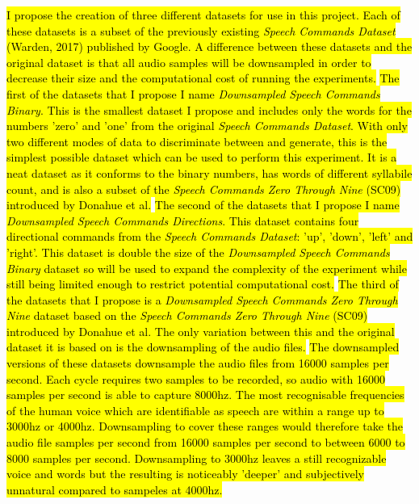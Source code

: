 \documentclass[titlepage]{article}
\begin{document}
\hl{
  I propose the creation of three different datasets for use in this project.
  Each of these datasets is a subset of the previously existing \textit{Speech Commands Dataset} (Warden, 2017) published by Google.
  A difference between these datasets and the original dataset is that all audio samples will be downsampled in order to decrease their size and the computational cost of running the experiments.
}
\newline
\newline
\hl{
  The first of the datasets that I propose I name \textit{Downsampled Speech Commands Binary}.
  This is the smallest dataset I propose and includes only the words for the numbers 'zero' and 'one' from the original \textit{Speech Commands Dataset}.
  With only two different modes of data to discriminate between and generate, this is the simplest possible dataset which can be used to perform this experiment.
  It is a neat dataset as it conforms to the binary numbers, has words of different syllabile count, and is also a subset of the \textit{Speech Commands Zero Through Nine} (SC09) introduced by Donahue et al.
}
\newline
\newline
\hl{
  The second of the datasets that I propose I name \textit{Downsampled Speech Commands Directions}.
  This dataset contains four directional commands from the \textit{Speech Commands Dataset}: 'up', 'down', 'left' and 'right'.
  This dataset is double the size of the \textit{Downsampled Speech Commands Binary} dataset so will be used to expand the complexity of the experiment while still being limited enough to restrict potential computational cost.
}
\newline
\newline
\hl{
  The third of the datasets that I propose is a \textit{Downsampled Speech Commands Zero Through Nine} dataset based on the \textit{Speech Commands Zero Through Nine} (SC09) introduced by Donahue et al.
  The only variation between this and the original dataset it is based on is the downsampling of the audio files.
}
\newline
\newline
\hl{
  The downsampled versions of these datasets downsample the audio files from 16000 samples per second.
  Each cycle requires two samples to be recorded, so audio with 16000 samples per second is able to capture 8000hz.
  The most recognisable frequencies of the human voice which are identifiable as speech are within a range up to 3000hz or 4000hz.
  Downsampling to cover these ranges would therefore take the audio file samples per second from 16000 samples per second to between 6000 to 8000 samples per second.
  Downsampling to 3000hz leaves a still recognizable voice and words but the resulting is noticeably 'deeper' and subjectively unnatural compared to sampeles at 4000hz.
}
\end{document}
